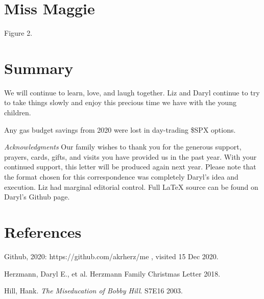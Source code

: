\documentclass[letterpaper,11pt]{article}
\makeatletter
\def\refer{\par\noindent\hangindent\parindent\hangafter1}
\newenvironment{figurehere}
  {\def\@captype{figure}}
  {}
\makeatother
\begin{document}
\begin{multicols}{2}
\bigskip

\section{Miss Maggie}

Figure 2.

\section{Summary}

We will continue to learn, love, and laugh together.  Liz and Daryl continue
to try to take things slowly and enjoy this precious time we have with the young
children.

\bigskip

\begin{figurehere}
    \centering   
    \caption{Any gas budget savings from 2020 were lost in day-trading \$SPX
    options.}
\end{figurehere}

\bigskip

\emph{Acknowledgments} Our family wishes to thank you for the generous 
support, prayers, cards, gifts, and visits you have provided us in the past
year. With your continued support, this letter will be produced again
next year. Please note that the format chosen for this
correspondence was completely Daryl's idea and execution. Liz had marginal
editorial control. Full \LaTeX\xspace source can be found on Daryl's Github
page.

\section{References}

\refer Github, 2020: https://github.com/akrherz/me , visited 15 Dec 2020.
\refer Herzmann, Daryl E., et al. Herzmann Family Christmas Letter 2018.
\refer Hill, Hank. \textit{The Miseducation of Bobby Hill}. S7E16 2003.

\end{multicols}
\end{document}
